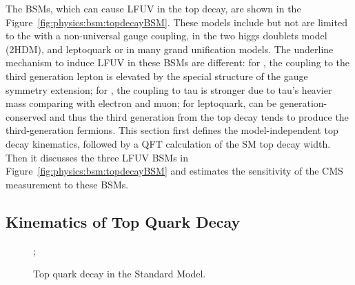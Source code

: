 The BSMs, which can cause LFUV in the top decay, are shown in the Figure~\ref{fig:physics:bsm:topdecayBSM}. These models include but not are limited to the \PWpr with a non-universal gauge coupling, \PSHp in the two higgs doublets model (2HDM), and leptoquark or \PLQ in many grand unification models. The underline mechanism to induce LFUV in these BSMs are different: for \PWpr, the coupling to the third generation lepton is elevated by the special structure of the gauge symmetry extension; for \PSHp, the coupling to tau is stronger due to tau's heavier mass comparing with electron and muon; for leptoquark, \PLQ can be generation-conserved and thus the third generation \PLQ from the top decay tends to produce the third-generation fermions. This section first defines the model-independent top decay kinematics, followed by a QFT calculation of the SM top decay width. Then it discusses the three LFUV BSMs in Figure~\ref{fig:physics:bsm:topdecayBSM} and estimates the sensitivity of the CMS \BWl measurement to these BSMs.



\subsection{Kinematics of Top Quark Decay}
\label{sec:physics:bsm:kinematics}

\begin{figure}[ht]
    \centering
    ;
    \caption{Top quark decay in the Standard Model.}
    \label{fig:physics:bsm:topdecaySM}
\end{figure}

